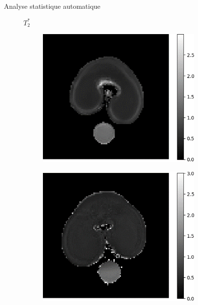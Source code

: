 \documentclass[10pt]{beamer}
\begin{document}
\begin{frame}{Analyse statistique automatique}

  \begin{figure}
    \centering
    $T_2^*$
    \begin{subfigure}[c]{0.33\textwidth}
      \centering
      \includegraphics[width=0.9\textwidth]{fig/manualcorr_irm250_t2.png}
      \caption{}
      \label{subfig:manualcorr_irm250_t2.png}
    \end{subfigure}%
    \begin{subfigure}[c]{0.33\textwidth}
      \centering
      \includegraphics[width=0.9\textwidth]{fig/manualcorr_irm650_t2}
      \caption{}

\end{subfigure}
\end{figure}
\end{frame}
\end{document}
